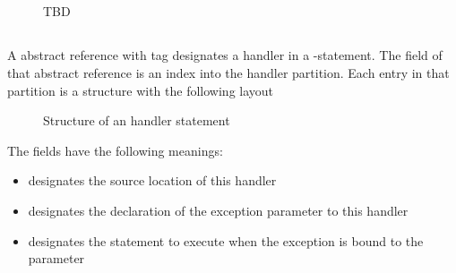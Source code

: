 \subsection{}
\label{sec:ifc:StmtSort:SyntaxTree}

\begin{figure}[H]
	\centering
	TBD
\end{figure}


\subsection{}
\label{sec:ifc:StmtSort:Handler}

A  abstract reference with tag  designates a handler in a -statement.
The  field of that abstract reference is an index into the handler partition.
Each entry in that partition is a structure with the following layout
%
\begin{figure}[H]
	\centering
	\caption{Structure of an handler statement}
	\label{fig:ifc-handler-stmt-structure}
\end{figure}
%
The fields have the following meanings:
\begin{itemize}
	\item {} designates the source location of this handler
	\item {} designates the declaration of the exception parameter to this handler
	\item {} designates the statement to execute when the exception is bound to the parameter
\end{itemize}


\subsection{}
\label{sec:ifc:StmtSort:Tuple}

